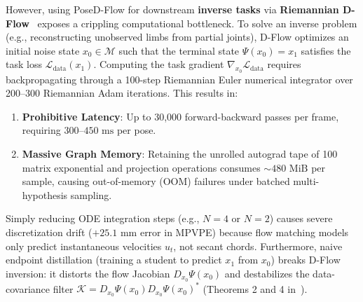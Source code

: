 \documentclass[10pt,twocolumn,letterpaper]{article}
\begin{document}
However, using PoseD-Flow for downstream \textbf{inverse tasks} via \textbf{Riemannian D-Flow}~\cite{benhamu2024dflow,nadar2026posedflow} exposes a crippling computational bottleneck. To solve an inverse problem (e.g., reconstructing unobserved limbs from partial joints), D-Flow optimizes an initial noise state $x_0 \in \mathcal{M}$ such that the terminal state $\Psi(x_0) = x_1$ satisfies the task loss $\mathcal{L}_{\mathrm{data}}(x_1)$. Computing the task gradient $\nabla_{x_0} \mathcal{L}_{\mathrm{data}}$ requires backpropagating through a 100-step Riemannian Euler numerical integrator over 200--300 Riemannian Adam iterations. This results in:
\begin{enumerate}
    \item \textbf{Prohibitive Latency}: Up to 30,000 forward-backward passes per frame, requiring $300\text{--}450\text{ ms}$ per pose.
    \item \textbf{Massive Graph Memory}: Retaining the unrolled autograd tape of 100 matrix exponential and projection operations consumes $\sim 480\text{ MiB}$ per sample, causing out-of-memory (OOM) failures under batched multi-hypothesis sampling.
\end{enumerate}

Simply reducing ODE integration steps (e.g., $N=4$ or $N=2$) causes severe discretization drift ($+25.1\text{ mm}$ error in MPVPE) because flow matching models only predict instantaneous velocities $u_t$, not secant chords. Furthermore, naive endpoint distillation (training a student to predict $x_1$ from $x_0$) breaks D-Flow inversion: it distorts the flow Jacobian $D_{x_0}\Psi(x_0)$ and destabilizes the data-covariance filter $\mathcal{K} = D_{x_0}\Psi(x_0) D_{x_0}\Psi(x_0)^*$ (Theorems 2 and 4 in~\cite{nadar2026posedflow}).
\end{document}
